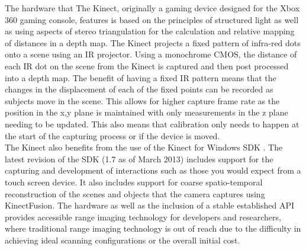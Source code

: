 
The hardware that The Kinect, originally a gaming device designed for the Xbox 360 gaming console, features is based on the principles of structured light as well as using aspects of stereo triangulation for the calculation and relative mapping of distances in a depth map. The Kinect projects a fixed pattern of infra-red dots onto a scene using an IR projector. Using a monochrome CMOS, the distance of each IR dot on the scene from the Kinect is captured and then post processed into a depth map. The benefit of having a fixed IR pattern means that the changes in the displacement of each of the fixed points can be recorded as subjects move in the scene. This allows for higher capture frame rate as the position in the x,y plane is maintained with only measurements in the z plane needing to be updated. This also means that calibration only needs to happen at the start of the capturing process or if the device is moved. \\ 

The Kinect also benefits from the use of the Kinect for Windows SDK \cite{SDK13}. The latest revision of the SDK (1.7 as of March 2013) includes support for the capturing and development of interactions such as those you would expect from a touch screen device. It also includes support for coarse spatio-temporal reconstruction of the scenes and objects that the camera captures using KinectFusion. The hardware as well as the inclusion of a stable established API provides accessible range imaging technology for developers and researchers, where traditional range imaging technology is out of reach due to the difficulty in achieving ideal scanning configurations or the overall initial cost. \\

